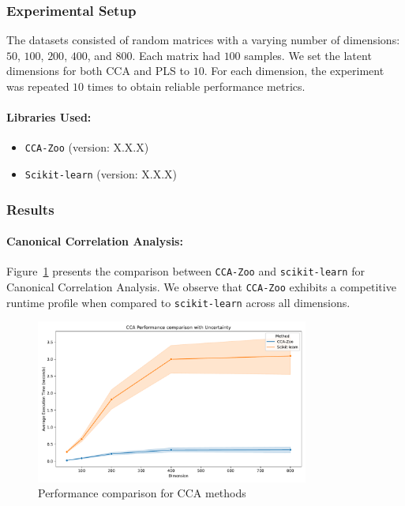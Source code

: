 \subsubsection{Experimental Setup}
The datasets consisted of random matrices with a varying number of dimensions: \(50\), \(100\), \(200\), \(400\), and \(800\). Each matrix had \(100\) samples. We set the latent dimensions for both CCA and PLS to \(10\). For each dimension, the experiment was repeated \(10\) times to obtain reliable performance metrics.

\paragraph{Libraries Used:}
\begin{itemize}
    \item \texttt{CCA-Zoo} (version: X.X.X)
    \item \texttt{Scikit-learn} (version: X.X.X)
\end{itemize}

\subsubsection{Results}

\paragraph{Canonical Correlation Analysis:}
Figure~\ref{fig:cca_benchmark} presents the comparison between \texttt{CCA-Zoo} and \texttt{scikit-learn} for Canonical Correlation Analysis. We observe that \texttt{CCA-Zoo} exhibits a competitive runtime profile when compared to \texttt{scikit-learn} across all dimensions.

\begin{figure}[h]
\centering
\includegraphics[width=0.8\textwidth]{figures/CCA_Speed_Benchmark}
\caption{Performance comparison for CCA methods}
\label{fig:cca_benchmark}
\end{figure}

